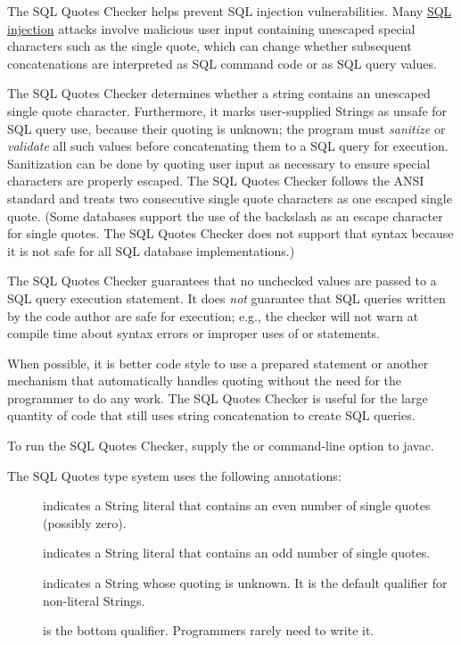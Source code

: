 
The SQL Quotes Checker helps prevent SQL injection vulnerabilities. Many
\href{https://en.wikipedia.org/wiki/Sql_injection}{SQL injection} attacks
involve malicious user input containing unescaped special characters such as the
single quote, which can change whether subsequent concatenations are interpreted
as SQL command code or as SQL query values.

The SQL Quotes Checker determines whether a string contains an unescaped
single quote character.  Furthermore, it marks user-supplied Strings as
unsafe for SQL query use, because their quoting is unknown; the program
must \emph{sanitize} or \emph{validate} all such values before concatenating
them to a SQL query for execution. Sanitization can be done by quoting user
input as necessary to ensure special characters are properly escaped.  The
SQL Quotes Checker follows the ANSI standard and treats two consecutive
single quote characters as one escaped single quote.  (Some databases
support the use of the backslash as an escape character for single quotes.
The SQL Quotes Checker does not support that syntax because it is not safe
for all SQL database implementations.)

The SQL Quotes Checker guarantees that no unchecked values are passed to a
SQL query execution statement.  It does \emph{not} guarantee that SQL
queries written by the code author are safe for execution; e.g., the
checker will not warn at compile time about syntax errors or improper uses
of  or  statements.

When possible, it is better code style to use a prepared statement or another mechanism
that automatically handles quoting without the need for the programmer to do
any work.  The SQL Quotes Checker is useful for the large quantity of code
that still uses string concatenation to create SQL queries.

To run the SQL Quotes Checker, supply the
or
command-line option to javac.



The SQL Quotes type system uses the following annotations:

\begin{description}
\item[]
    indicates a String literal that contains an even number of
    single quotes (possibly zero).
\item[]
    indicates a String literal that contains an odd number of single
    quotes.
\item[]
    indicates a String whose quoting is unknown.
    It is the default qualifier for non-literal
    Strings.
\item[]
    is the bottom qualifier.  Programmers rarely need to write it.
\end{description}

